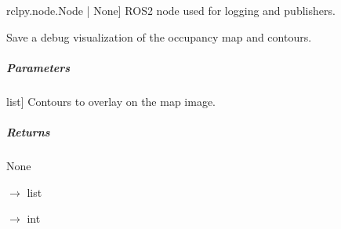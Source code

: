 \documentclass[letterpaper,10pt,english]{sphinxmanual}
\begin{document}
\begin{fulllineitems}
\begin{description}
\sphinxlineitem{node}{[}rclpy.node.Node | None{]}
\sphinxAtStartPar
ROS2 node used for logging and publishers.

\end{description}

\begin{fulllineitems}
\label{\detokenize{mirte_lc_nav2.navigator_types:mirte_lc_nav2.navigator_types.SystematicNavigator.debug_save}}
\pysigstartsignatures
\pysiglinewithargsret
{}
{}
{}
\pysigstopsignatures
\sphinxAtStartPar
Save a debug visualization of the occupancy map and contours.


\subparagraph{Parameters}
\label{\detokenize{mirte_lc_nav2.navigator_types:parameters}}\begin{description}
\sphinxlineitem{contours}{[}list{]}
\sphinxAtStartPar
Contours to overlay on the map image.

\end{description}


\subparagraph{Returns}
\label{\detokenize{mirte_lc_nav2.navigator_types:returns}}
\sphinxAtStartPar
None

\end{fulllineitems}


\begin{fulllineitems}
\label{\detokenize{mirte_lc_nav2.navigator_types:mirte_lc_nav2.navigator_types.SystematicNavigator.find_leaf_nodes}}
\pysigstartsignatures
\pysiglinewithargsret
{}
{}
{{ $\rightarrow$ list}}
\pysigstopsignatures
\end{fulllineitems}


\begin{fulllineitems}
\label{\detokenize{mirte_lc_nav2.navigator_types:mirte_lc_nav2.navigator_types.SystematicNavigator.find_nearest_node}}
\pysigstartsignatures
\pysiglinewithargsret
{}
{\sphinxparamcomma {}\sphinxparamcomma {}}
{{ $\rightarrow$ int}}
\pysigstopsignatures
\end{fulllineitems}


\end{fulllineitems}
\end{document}
